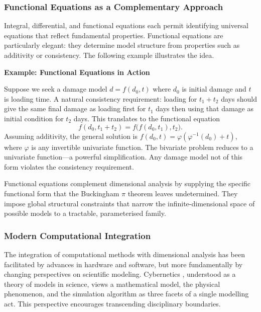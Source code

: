 \subsubsection*{Functional Equations as a Complementary Approach}

Integral, differential, and functional equations each permit identifying universal equations that reflect fundamental properties. Functional equations are particularly elegant: they determine model structure from properties such as additivity or consistency. The following example illustrates the idea.

\begin{examplebox}
\textbf{Example: Functional Equations in Action}

Suppose we seek a damage model \(d = f(d_0, t)\) where \(d_0\) is initial damage and \(t\) is loading time. A natural consistency requirement: loading for \(t_1+t_2\) days should give the same final damage as loading first for \(t_1\) days then using that damage as initial condition for \(t_2\) days. This translates to the functional equation
\begin{equation}
f(d_0, t_1+t_2) = f\bigl(f(d_0, t_1), t_2\bigr).
\end{equation}
Assuming additivity, the general solution is \(f(d_0,t) = \varphi(\varphi^{-1}(d_0)+t)\), where \(\varphi\) is any invertible univariate function. The bivariate problem reduces to a univariate function—a powerful simplification. Any damage model not of this form violates the consistency requirement.
\end{examplebox}

Functional equations complement dimensional analysis by supplying the specific functional form that the Buckingham \(\pi\) theorem leaves undetermined. They impose global structural constraints that narrow the infinite-dimensional space of possible models to a tractable, parameterised family.

\subsubsection*{Modern Computational Integration}

The integration of computational methods with dimensional analysis has been facilitated by advances in hardware and software, but more fundamentally by changing perspectives on scientific modeling. Cybernetics \cite{Wiener48, longo2021}, understood as a theory of models in science, views a mathematical model, the physical phenomenon, and the simulation algorithm as three facets of a single modelling act. This perspective encourages transcending disciplinary boundaries.

